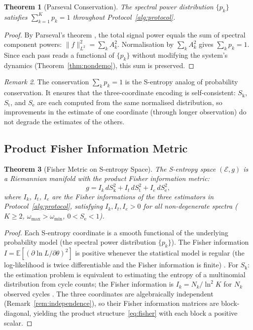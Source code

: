 \documentclass[11pt,twocolumn,a4paper]{article}
\newtheorem{theorem}{Theorem}[section]
\theoremstyle{definition}
\theoremstyle{remark}
\newtheorem{remark}[theorem]{Remark}
\newcommand{\Sk}{S_{\mathrm{k}}}
\newcommand{\St}{S_{\mathrm{t}}}
\newcommand{\Se}{S_{\mathrm{e}}}
\begin{document}
\begin{theorem}[Parseval Conservation]
\label{thm:parseval}
The spectral power distribution $\{p_k\}$ satisfies $\sum_{k=1}^K p_k = 1$
throughout Protocol~\ref{alg:protocol}.
\end{theorem}

\begin{proof}
By Parseval's theorem \citep{parseval1806}, the total signal power equals the
sum of spectral component powers: $\|f\|_{L^2}^2 = \sum_k A_k^2$. Normalisation
by $\sum_k A_k^2$ gives $\sum_k p_k = 1$. Since each pass reads a functional
of $\{p_k\}$ without modifying the system's dynamics (Theorem~\ref{thm:nondemo}),
this sum is preserved.
\end{proof}

\begin{remark}
The conservation $\sum_k p_k = 1$ is the S-entropy analog of probability
conservation. It ensures that the three-coordinate encoding is self-consistent:
$\Sk$, $\St$, and $\Se$ are each computed from the same normalised distribution,
so improvements in the estimate of one coordinate (through longer observation)
do not degrade the estimates of the others.
\end{remark}



\subsection{Product Fisher Information Metric}

\begin{theorem}[Fisher Metric on S-entropy Space]
\label{thm:fisher}
The S-entropy space $(\mathcal{E}, g)$ is a Riemannian manifold with
the product Fisher information metric:
\begin{equation}
g = I_k\, d\Sk^2 + I_t\, d\St^2 + I_e\, d\Se^2,
\label{eq:fisher}
\end{equation}
where $I_k$, $I_t$, $I_e$ are the Fisher informations of the three
estimators in Protocol~\ref{alg:protocol}, satisfying $I_k, I_t, I_e > 0$
for all non-degenerate spectra ($K \geq 2$, $\omega_{\max} > \omega_{\min}$,
$0 < \Se < 1$).
\end{theorem}

\begin{proof}
Each S-entropy coordinate is a smooth functional of the underlying probability
model (the spectral power distribution $\{p_k\}$). The Fisher information
$I = \mathbb{E}[(\partial \ln L / \partial \theta)^2]$ is positive whenever the
statistical model is regular (the log-likelihood is twice differentiable and the
Fisher information is finite) \citep{fisher1922, rao1945, cramer1946}.
For $\Sk$: the estimation problem is equivalent to estimating the entropy of
a multinomial distribution from cycle counts; the Fisher information is
$I_k = N_k / \ln^2 K$ for $N_k$ observed cycles \citep{paninski2003}.
The three coordinates are algebraically independent (Remark~\ref{rem:independence}),
so their Fisher information matrices are block-diagonal, yielding the
product structure~\eqref{eq:fisher} with each block a positive scalar.
\end{proof}
\end{document}
